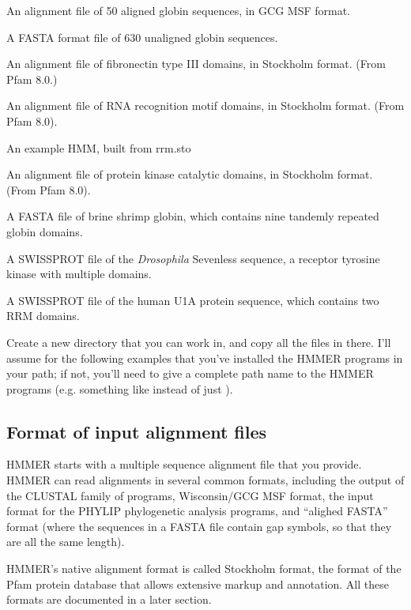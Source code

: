 \begin{wideitem}
\item[\emprog{globins50.msf}] An alignment file of 50 aligned globin
sequences, in GCG MSF format.
\item[\emprog{globins630.fa}] A FASTA format file of 630 unaligned globin sequences.
\item[\emprog{ fn3.sto}] An alignment file of fibronectin type III
domains, in Stockholm format. (From Pfam 8.0.)
\item[\emprog{ rrm.sto}] An alignment file of RNA recognition
motif domains, in Stockholm format. (From Pfam 8.0).
\item[\emprog{ rrm.hmm}] An example HMM, built from rrm.sto
\item[\emprog{ pkinase.sto}] An alignment file of protein kinase
catalytic domains, in Stockholm format. (From Pfam 8.0).
\item[\emprog{ Artemia.fa}] A FASTA file of brine shrimp globin, which contains
nine tandemly repeated globin domains.
\item[\emprog{ 7LES\_DROME}] A SWISSPROT file of the \emph{ Drosophila} 
Sevenless sequence, a receptor tyrosine kinase with multiple domains.
\item[\emprog{ RU1A\_HUMAN}] A SWISSPROT file of the human U1A
protein sequence, which contains two RRM domains.
\end{wideitem}

Create a new directory that you can work in, and copy all the files in
 there. I'll assume for the following examples that you've
installed the HMMER programs in your path; if not, you'll need to give
a complete path name to the HMMER programs (e.g. something like  instead of just
).

\subsection{Format of input alignment files}

HMMER starts with a multiple sequence alignment file that you
provide. HMMER can read alignments in several common formats,
including the output of the CLUSTAL family of programs, Wisconsin/GCG
MSF format, the input format for the PHYLIP phylogenetic analysis
programs, and ``alighed FASTA'' format (where the sequences in a FASTA
file contain gap symbols, so that they are all the same length).

HMMER's native alignment format is called Stockholm format, the format
of the Pfam protein database that allows extensive markup and
annotation. All these formats are documented in a later section.


